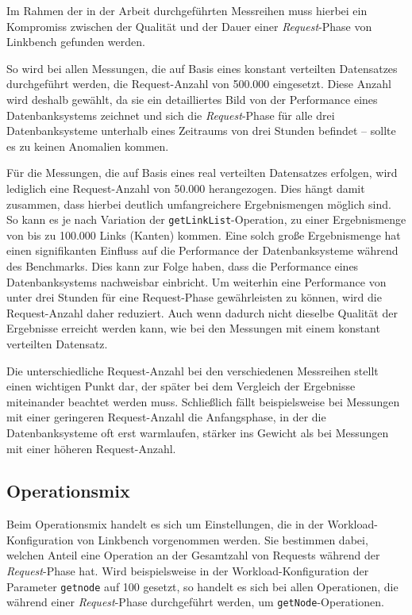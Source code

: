Im Rahmen der in der Arbeit durchgeführten Messreihen muss hierbei ein Kompromiss zwischen der Qualität und der Dauer einer \textit{Request}-Phase von Linkbench gefunden werden. 

So wird bei allen Messungen, die auf Basis eines konstant verteilten Datensatzes durchgeführt werden, die Request-Anzahl von 500.000 eingesetzt. Diese Anzahl wird deshalb gewählt, da sie ein detailliertes Bild von der Performance eines Datenbanksystems zeichnet und sich die \textit{Request}-Phase für alle drei Datenbanksysteme unterhalb eines Zeitraums von drei Stunden befindet -- sollte es zu keinen Anomalien kommen. 

Für die Messungen, die auf Basis eines real verteilten Datensatzes erfolgen, wird lediglich eine Request-Anzahl von 50.000 herangezogen. Dies hängt damit zusammen, dass hierbei deutlich umfangreichere Ergebnismengen möglich sind. So kann es je nach Variation der \texttt{getLinkList}-Ope\-ra\-ti\-on, zu einer Ergebnismenge von bis zu 100.000 Links (Kanten) kommen. Eine solch große Ergebnismenge hat einen signifikanten Einfluss auf die Performance der Datenbanksysteme während des Benchmarks. Dies kann zur Folge haben, dass die Performance eines Datenbanksystems nachweisbar einbricht. Um weiterhin eine Performance von unter drei Stunden für eine Request-Phase gewährleisten zu können, wird die Request-Anzahl daher reduziert. Auch wenn dadurch nicht dieselbe Qualität der Ergebnisse erreicht werden kann, wie bei den Messungen mit einem konstant verteilten Datensatz.

Die unterschiedliche Request-Anzahl bei den verschiedenen Messreihen stellt einen wichtigen Punkt dar, der später bei dem Vergleich der Ergebnisse miteinander beachtet werden muss. Schließlich fällt beispielsweise bei Messungen mit einer geringeren Request-Anzahl die Anfangsphase, in der die Datenbanksysteme oft erst warmlaufen, stärker ins Gewicht als bei Messungen mit einer höheren Request-Anzahl.

\subsection{Operationsmix}
\label{analyse:linkbench:operationsmix}
Beim Operationsmix handelt es sich um Einstellungen, die in der Workload-Konfiguration von Linkbench vorgenommen werden. Sie bestimmen dabei, welchen Anteil eine Operation an der Gesamtzahl von Requests während der \textit{Request}-Phase hat. Wird beispielsweise in der Workload-Konfiguration der Parameter \texttt{getnode} auf 100 gesetzt, so handelt es sich bei allen Operationen, die während einer \textit{Request}-Phase durchgeführt werden, um \texttt{getNode}-Operationen.

